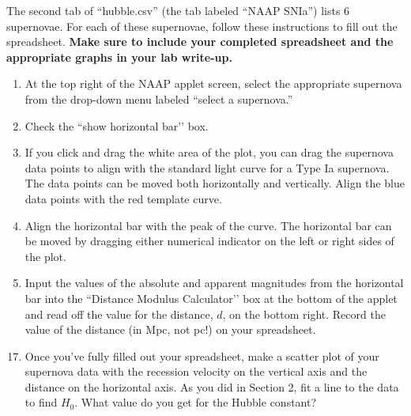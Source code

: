 \documentclass[11pt]{article}
\begin{document}
\medskip \noindent
The second tab of ``hubble.csv'' (the tab labeled ``NAAP SNIa'') lists 6 supernovae. For each of these supernovae, follow these instructions to fill out the spreadsheet.  \textbf{Make sure to include your completed spreadsheet and the appropriate graphs in your lab write-up.}
\begin{enumerate}[label=Step \arabic*:]
    \item At the top right of the NAAP applet screen, select the appropriate supernova from the drop-down menu labeled ``select a supernova.''
    
    \item Check the ``show horizontal bar'’ box.
    
    \item If you click and drag the white area of the plot, you can drag the supernova data points to align with the standard light curve for a Type Ia supernova. The data points can be moved both horizontally and vertically. Align the blue data points with the red template curve.
    
    \item Align the horizontal bar with the peak of the curve. The horizontal bar can be moved by dragging either numerical indicator on the left or right sides of the plot.
    
    \item Input the values of the absolute and apparent magnitudes from the horizontal bar into the ``Distance Modulus Calculator'’ box at the bottom of the applet and read off the value for the distance, $d$, on the bottom right. Record the value of the distance (in Mpc, not pc!) on your spreadsheet.
    
\end{enumerate} 

\begin{enumerate}
    \setcounter{enumi}{16}
    \item Once you've fully filled out your spreadsheet, make a scatter plot of your supernova data with the recession velocity on the vertical axis and the distance on the horizontal axis. As you did in Section 2, fit a line to the data to find $H_0$. What value do you get for the Hubble constant?
\end{enumerate}
\end{document}
